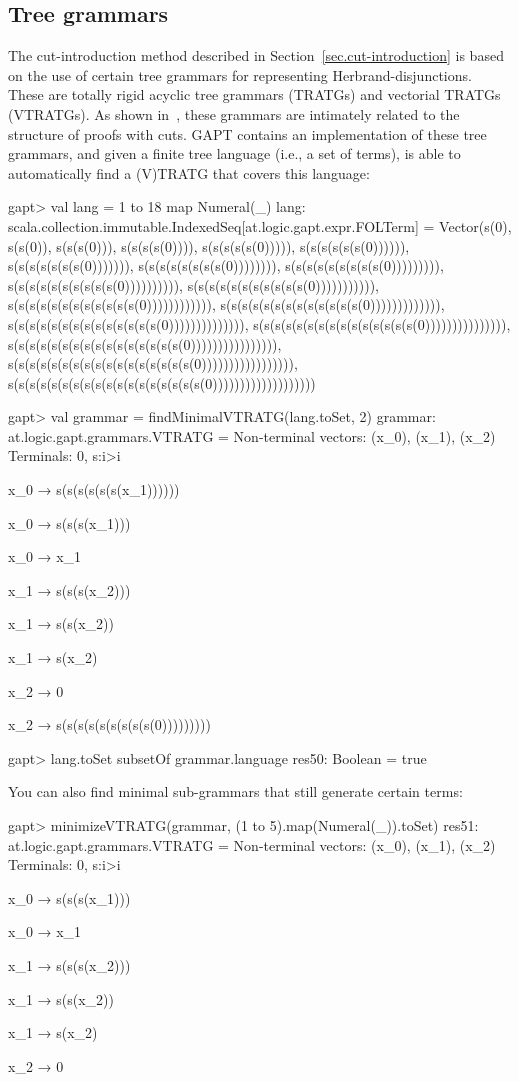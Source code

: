 \documentclass[a4paper,11pt]{article}
\begin{document}
\subsection{Tree grammars}

The cut-introduction method described in Section~\ref{sec.cut-introduction} is
based on the use of certain tree grammars for representing Herbrand-disjunctions.
These are totally rigid acyclic tree grammars (TRATGs) and vectorial TRATGs (VTRATGs).
As shown in~\cite{Hetzl14Algorithmic}, these grammars are intimately related to
the structure of proofs with cuts.  GAPT contains an implementation of
these tree grammars, and given a finite tree language (i.e., a set of terms), is
able to automatically find a (V)TRATG that covers this language:

\begin{clilisting}
gapt> val lang = 1 to 18 map { Numeral(_) }
lang: scala.collection.immutable.IndexedSeq[at.logic.gapt.expr.FOLTerm] = Vector(s(0), s(s(0)), s(s(s(0))), s(s(s(s(0)))), s(s(s(s(s(0))))), s(s(s(s(s(s(0)))))), s(s(s(s(s(s(s(0))))))), s(s(s(s(s(s(s(s(0)))))))), s(s(s(s(s(s(s(s(s(0))))))))), s(s(s(s(s(s(s(s(s(s(0)))))))))), s(s(s(s(s(s(s(s(s(s(s(0))))))))))), s(s(s(s(s(s(s(s(s(s(s(s(0)))))))))))), s(s(s(s(s(s(s(s(s(s(s(s(s(0))))))))))))), s(s(s(s(s(s(s(s(s(s(s(s(s(s(0)))))))))))))), s(s(s(s(s(s(s(s(s(s(s(s(s(s(s(0))))))))))))))), s(s(s(s(s(s(s(s(s(s(s(s(s(s(s(s(0)))))))))))))))), s(s(s(s(s(s(s(s(s(s(s(s(s(s(s(s(s(0))))))))))))))))), s(s(s(s(s(s(s(s(s(s(s(s(s(s(s(s(s(s(0)))))))))))))))))))

gapt> val grammar = findMinimalVTRATG(lang.toSet, 2)
grammar: at.logic.gapt.grammars.VTRATG =
Non-terminal vectors: (x_0), (x_1), (x_2)
Terminals: 0, s:i>i

x_0 → s(s(s(s(s(s(x_1))))))

x_0 → s(s(s(x_1)))

x_0 → x_1

x_1 → s(s(s(x_2)))

x_1 → s(s(x_2))

x_1 → s(x_2)

x_2 → 0

x_2 → s(s(s(s(s(s(s(s(s(0)))))))))

gapt> lang.toSet subsetOf grammar.language
res50: Boolean = true

\end{clilisting}

You can also find minimal sub-grammars that still generate certain terms:
\begin{clilisting}
gapt> minimizeVTRATG(grammar, (1 to 5).map(Numeral(_)).toSet)
res51: at.logic.gapt.grammars.VTRATG =
Non-terminal vectors: (x_0), (x_1), (x_2)
Terminals: 0, s:i>i

x_0 → s(s(s(x_1)))

x_0 → x_1

x_1 → s(s(s(x_2)))

x_1 → s(s(x_2))

x_1 → s(x_2)

x_2 → 0

\end{clilisting}
\end{document}
